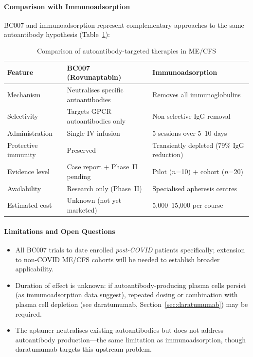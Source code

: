 \paragraph{Comparison with Immunoadsorption}
BC007 and immunoadsorption represent complementary approaches to the same autoantibody hypothesis (Table~\ref{tab:autoantibody-comparison}):

\begin{table}[htbp]
\centering
\caption{Comparison of autoantibody-targeted therapies in ME/CFS}
\label{tab:autoantibody-comparison}
\small
\begin{tabular}{l p{} p{}}
\toprule
\textbf{Feature} & \textbf{BC007 (Rovunaptabin)} & \textbf{Immunoadsorption} \\
\midrule
Mechanism & Neutralises specific autoantibodies & Removes all immunoglobulins \\
Selectivity & Targets GPCR autoantibodies only & Non-selective IgG removal \\
Administration & Single IV infusion & 5 sessions over 5--10 days \\
Protective immunity & Preserved & Transiently depleted (79\% IgG reduction) \\
Evidence level & Case report + Phase~II pending & Pilot ($n$=10) + cohort ($n$=20) \\
Availability & Research only (Phase~II) & Specialised apheresis centres \\
Estimated cost & Unknown (not yet marketed) & \texteuro{}5,000--15,000 per course \\
\bottomrule
\end{tabular}
\end{table}

\paragraph{Limitations and Open Questions}
\begin{itemize}
    \item All BC007 trials to date enrolled \textit{post-COVID} patients specifically; extension to non-COVID ME/CFS cohorts will be needed to establish broader applicability.
    \item Duration of effect is unknown: if autoantibody-producing plasma cells persist (as immunoadsorption data suggest), repeated dosing or combination with plasma cell depletion (see daratumumab, Section~\ref{sec:daratumumab}) may be required.
    \item The aptamer neutralises existing autoantibodies but does not address autoantibody production---the same limitation as immunoadsorption, though daratumumab targets this upstream problem.
\end{itemize}


